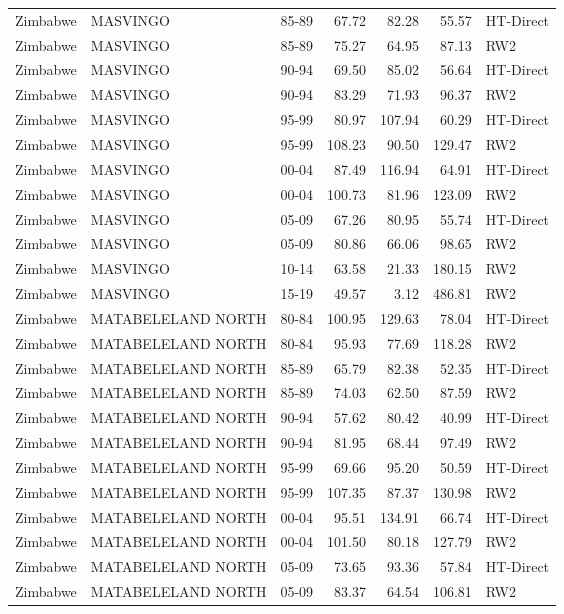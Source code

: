 \begin{longtable}{lllrrrl}
  Zimbabwe & MASVINGO & 85-89 & 67.72 & 82.28 & 55.57 & HT-Direct \\ 
  Zimbabwe & MASVINGO & 85-89 & 75.27 & 64.95 & 87.13 & RW2 \\ 
  Zimbabwe & MASVINGO & 90-94 & 69.50 & 85.02 & 56.64 & HT-Direct \\ 
  Zimbabwe & MASVINGO & 90-94 & 83.29 & 71.93 & 96.37 & RW2 \\ 
  Zimbabwe & MASVINGO & 95-99 & 80.97 & 107.94 & 60.29 & HT-Direct \\ 
  Zimbabwe & MASVINGO & 95-99 & 108.23 & 90.50 & 129.47 & RW2 \\ 
  Zimbabwe & MASVINGO & 00-04 & 87.49 & 116.94 & 64.91 & HT-Direct \\ 
  Zimbabwe & MASVINGO & 00-04 & 100.73 & 81.96 & 123.09 & RW2 \\ 
  Zimbabwe & MASVINGO & 05-09 & 67.26 & 80.95 & 55.74 & HT-Direct \\ 
  Zimbabwe & MASVINGO & 05-09 & 80.86 & 66.06 & 98.65 & RW2 \\ 
  Zimbabwe & MASVINGO & 10-14 & 63.58 & 21.33 & 180.15 & RW2 \\ 
  Zimbabwe & MASVINGO & 15-19 & 49.57 & 3.12 & 486.81 & RW2 \\ 
  Zimbabwe & MATABELELAND NORTH & 80-84 & 100.95 & 129.63 & 78.04 & HT-Direct \\ 
  Zimbabwe & MATABELELAND NORTH & 80-84 & 95.93 & 77.69 & 118.28 & RW2 \\ 
  Zimbabwe & MATABELELAND NORTH & 85-89 & 65.79 & 82.38 & 52.35 & HT-Direct \\ 
  Zimbabwe & MATABELELAND NORTH & 85-89 & 74.03 & 62.50 & 87.59 & RW2 \\ 
  Zimbabwe & MATABELELAND NORTH & 90-94 & 57.62 & 80.42 & 40.99 & HT-Direct \\ 
  Zimbabwe & MATABELELAND NORTH & 90-94 & 81.95 & 68.44 & 97.49 & RW2 \\ 
  Zimbabwe & MATABELELAND NORTH & 95-99 & 69.66 & 95.20 & 50.59 & HT-Direct \\ 
  Zimbabwe & MATABELELAND NORTH & 95-99 & 107.35 & 87.37 & 130.98 & RW2 \\ 
  Zimbabwe & MATABELELAND NORTH & 00-04 & 95.51 & 134.91 & 66.74 & HT-Direct \\ 
  Zimbabwe & MATABELELAND NORTH & 00-04 & 101.50 & 80.18 & 127.79 & RW2 \\ 
  Zimbabwe & MATABELELAND NORTH & 05-09 & 73.65 & 93.36 & 57.84 & HT-Direct \\ 
  Zimbabwe & MATABELELAND NORTH & 05-09 & 83.37 & 64.54 & 106.81 & RW2 \\ 

\end{longtable}

